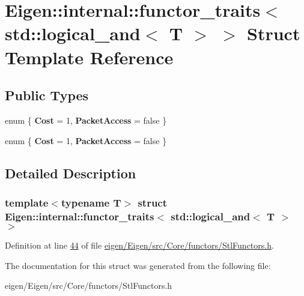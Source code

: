\hypertarget{struct_eigen_1_1internal_1_1functor__traits_3_01std_1_1logical__and_3_01_t_01_4_01_4}{}\section{Eigen\+:\+:internal\+:\+:functor\+\_\+traits$<$ std\+:\+:logical\+\_\+and$<$ T $>$ $>$ Struct Template Reference}
\label{struct_eigen_1_1internal_1_1functor__traits_3_01std_1_1logical__and_3_01_t_01_4_01_4}
\subsection*{Public Types}
\begin{DoxyCompactItemize}
\item 
\mbox{\label{struct_eigen_1_1internal_1_1functor__traits_3_01std_1_1logical__and_3_01_t_01_4_01_4_a6f4429e59ff6daa71104e270633dd559}} 
enum \{ {\bfseries Cost} = 1, 
{\bfseries Packet\+Access} = false
 \}
\item 
\mbox{\label{struct_eigen_1_1internal_1_1functor__traits_3_01std_1_1logical__and_3_01_t_01_4_01_4_a48a0fb47dc37952752acf4999943e78c}} 
enum \{ {\bfseries Cost} = 1, 
{\bfseries Packet\+Access} = false
 \}
\end{DoxyCompactItemize}


\subsection{Detailed Description}
\subsubsection*{template$<$typename T$>$\newline
struct Eigen\+::internal\+::functor\+\_\+traits$<$ std\+::logical\+\_\+and$<$ T $>$ $>$}



Definition at line \hyperlink{eigen_2_eigen_2src_2_core_2functors_2_stl_functors_8h_source_l00044}{44} of file \hyperlink{eigen_2_eigen_2src_2_core_2functors_2_stl_functors_8h_source}{eigen/\+Eigen/src/\+Core/functors/\+Stl\+Functors.\+h}.



The documentation for this struct was generated from the following file\+:\begin{DoxyCompactItemize}
\item 
eigen/\+Eigen/src/\+Core/functors/\+Stl\+Functors.\+h\end{DoxyCompactItemize}
